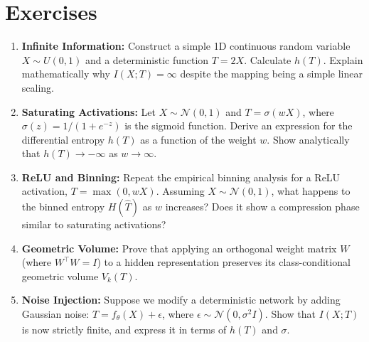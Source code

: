 \section*{Exercises}
\begin{enumerate}
    \item \textbf{Infinite Information:} Construct a simple 1D continuous random variable $X \sim U(0, 1)$ and a deterministic function $T = 2X$. Calculate $h(T)$. Explain mathematically why $I(X; T) = \infty$ despite the mapping being a simple linear scaling.
    \item \textbf{Saturating Activations:} Let $X \sim \mathcal{N}(0, 1)$ and $T = \sigma(wX)$, where $\sigma(z) = 1/(1+e^{-z})$ is the sigmoid function. Derive an expression for the differential entropy $h(T)$ as a function of the weight $w$. Show analytically that $h(T) \to -\infty$ as $w \to \infty$.
    \item \textbf{ReLU and Binning:} Repeat the empirical binning analysis for a ReLU activation, $T = \max(0, wX)$. Assuming $X \sim \mathcal{N}(0, 1)$, what happens to the binned entropy $H(\hat{T})$ as $w$ increases? Does it show a compression phase similar to saturating activations?
    \item \textbf{Geometric Volume:} Prove that applying an orthogonal weight matrix $W$ (where $W^\top W = I$) to a hidden representation preserves its class-conditional geometric volume $V_k(T)$. 
    \item \textbf{Noise Injection:} Suppose we modify a deterministic network by adding Gaussian noise: $T = f_\theta(X) + \epsilon$, where $\epsilon \sim \mathcal{N}(0, \sigma^2 I)$. Show that $I(X; T)$ is now strictly finite, and express it in terms of $h(T)$ and $\sigma$.
\end{enumerate}

